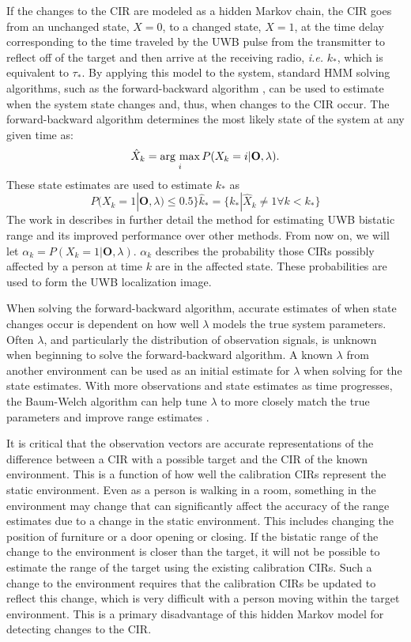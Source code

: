 \documentclass[conference]{IEEEtran}
\newcommand{\argmax}{\operatornamewithlimits{arg\ max}}
\begin{document}
If the changes to the CIR are modeled as a hidden Markov chain, the
CIR goes from an unchanged state, $X=0$, to a changed state, $X=1$, at
the time delay corresponding to the time traveled by the UWB pulse
from the transmitter to reflect off of the target and then arrive at
the receiving radio, \emph{i.e.} $k_*$, which is equivalent to
$\tau_*$. By applying this model to the system, standard HMM solving
algorithms, such as the forward-backward algorithm \cite{Rabiner}, can
be used to estimate when the system state changes and, thus, when
changes to the CIR occur. The forward-backward algorithm determines
the most likely state of the system at any given time as:
\begin{equation} \hat{X}_k = \argmax_i P(X_k=i|\mathbf{O},\lambda).
\end{equation} These state estimates are used to estimate $k_*$ as
\begin{equation} \label{E:k_*} P(X_k=1|\mathbf{O},\lambda) \leq 0.5 \} \hat{k}_* = \{ k_* | \hat{X}_k
\neq 1 \forall k < k_* \}
\end{equation} The work in \cite{McCracken} describes in further
detail the method for estimating UWB bistatic range and its improved
performance over other methods. From now on, we will let $\alpha_k =
P(X_k=1|\mathbf{O},\lambda)$. $\alpha_k$ describes the probability
those CIRs possibly affected by a person at time $k$ are in the
affected state. These probabilities are used to form the UWB
localization image.

When solving the forward-backward algorithm, accurate estimates of
when state changes occur is dependent on how well $\lambda$ models the
true system parameters. Often $\lambda$, and particularly the
distribution of observation signals, is unknown when beginning to
solve the forward-backward algorithm. A known $\lambda$ from another
environment can be used as an initial estimate for $\lambda$ when
solving for the state estimates. With more observations and state
estimates as time progresses, the Baum-Welch algorithm can help tune
$\lambda$ to more closely match the true parameters and improve range
estimates \cite{Rabiner, McCracken}.

It is critical that the observation vectors are accurate
representations of the difference between a CIR with a possible target
and the CIR of the known environment. This is a function of how well
the calibration CIRs represent the static environment. Even as a
person is walking in a room, something in the environment may change
that can significantly affect the accuracy of the range estimates due
to a change in the static environment. This includes changing the
position of furniture or a door opening or closing. If the bistatic
range of the change to the environment is closer than the target, it
will not be possible to estimate the range of the target using the
existing calibration CIRs. Such a change to the environment requires
that the calibration CIRs be updated to reflect this change, which is
very difficult with a person moving within the target
environment. This is a primary disadvantage of this hidden Markov
model for detecting changes to the CIR.
\end{document}
